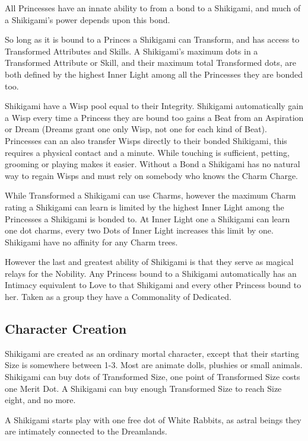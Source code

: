 All Princesses have an innate ability to from a bond to a Shikigami, and much of a Shikigami's power depends upon this bond. 

So long as it is bound to a Princes a Shikigami can Transform, and has access to Transformed Attributes and Skills. A Shikigami's maximum dots in a Transformed Attribute or Skill, and their maximum total Transformed dots, are both defined by the highest Inner Light among all the Princesses they are bonded too.

Shikigami have a Wisp pool equal to their Integrity. Shikigami automatically gain a Wisp every time a Princess they are bound too gains a Beat from an Aspiration or Dream (Dreams grant one only Wisp, not one for each kind of Beat). Princesses can an also transfer Wisps directly to their bonded Shikigami, this requires a physical contact and a minute. While touching is sufficient, petting, grooming or playing makes it easier. Without a Bond a Shikigami has no natural way to regain Wisps and must rely on somebody who knows the Charm Charge. 

While Transformed a Shikigami can use Charms, however the maximum Charm rating a Shikigami can learn is limited by the highest Inner Light among the Princesses a Shikigami is bonded to. At Inner Light one a Shikigami can learn one dot charms, every two Dots of Inner Light increases this limit by one. Shikigami have no affinity for any Charm trees. 

However the last and greatest ability of Shikigami is that they serve as magical relays for the Nobility. Any Princess bound to a Shikigami automatically has an Intimacy equivalent to Love to that Shikigami and every other Princess bound to her. Taken as a group they have a Commonality of Dedicated.

\subsection*{Character Creation}

Shikigami are created as an ordinary mortal character, except that their starting Size is somewhere between 1-3. Most are animate dolls, plushies or small animals. Shikigami can buy dots of Transformed Size, one point of Transformed Size costs one Merit Dot. A Shikigami can buy enough Transformed Size to reach Size eight, and no more.

A Shikigami starts play with one free dot of White Rabbits, as astral beings they are intimately connected to the Dreamlands.

